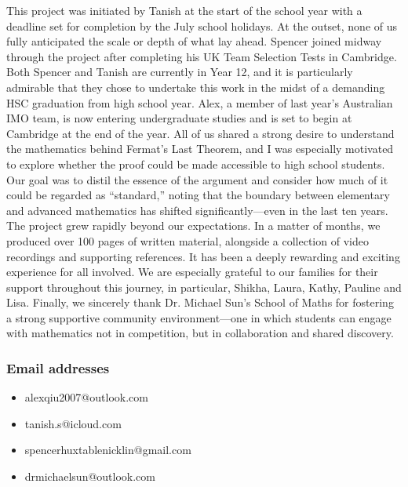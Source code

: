 \documentclass{article}
\theoremstyle{definition}
\theoremstyle{definition}
\theoremstyle{definition}
\begin{document}
This project was initiated by Tanish at the start of the school year with a deadline set for completion by the July school holidays. At the outset, none of us fully anticipated the scale or depth of what lay ahead. Spencer joined midway through the project after completing his UK Team Selection Tests in Cambridge. Both Spencer and Tanish are currently in Year 12, and it is particularly admirable that they chose to undertake this work in the midst of a demanding HSC graduation from high school year.
\newline\newline
Alex, a member of last year’s Australian IMO team, is now entering undergraduate studies and is set to begin at Cambridge at the end of the year. All of us shared a strong desire to understand the mathematics behind Fermat’s Last Theorem, and I was especially motivated to explore whether the proof could be made accessible to high school students. Our goal was to distil the essence of the argument and consider how much of it could be regarded as “standard,” noting that the boundary between elementary and advanced mathematics has shifted significantly—even in the last ten years.
\newline\newline
The project grew rapidly beyond our expectations. In a matter of months, we produced over 100 pages of written material, alongside a collection of video recordings and supporting references. It has been a deeply rewarding and exciting experience for all involved.
\newline\newline
We are especially grateful to our families for their support throughout this journey, in particular, Shikha, Laura, Kathy, Pauline and Lisa. Finally, we sincerely thank Dr. Michael Sun’s School of Maths for fostering a strong supportive community environment—one in which students can engage with mathematics not in competition, but in collaboration and shared discovery.

\subsubsection{Email addresses}

\begin{itemize}
\item 
alexqiu2007@outlook.com
    \item tanish.s@icloud.com
    \item 
spencerhuxtablenicklin@gmail.com
    \item drmichaelsun@outlook.com
\end{itemize}
\end{document}
